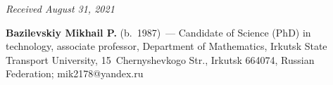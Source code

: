 \vspace*{-6pt}

\hfill{\small\textit{Received August 31, 2021}}

\Contrl

\noindent
\textbf{Bazilevskiy Mikhail P.} (b.\ 1987)~--- Candidate of Science (PhD) in technology, associate 
professor, Department of Mathematics, Irkutsk State Transport University, 15~Chernyshevkogo Str., Irkutsk 
664074, Russian Federation; \mbox{mik2178@yandex.ru}



\label{end\stat}

\renewcommand{\bibname}{\protect\rm Литература}    